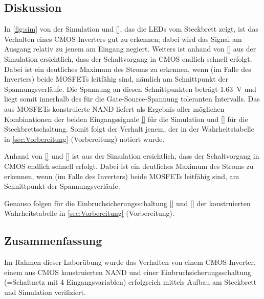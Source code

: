 \documentclass[12pt,english,ngerman]{scrartcl}
\begin{document}
\subsection{Diskussion}
In \autoref{fig:sim} von der Simulation und \autoref{}, das die LEDs vom Steckbrett zeigt,
ist das Verhalten eines CMOS-Inverters gut zu erkennen; dabei wird das Signal
am Ausgang relativ zu jenem am Eingang negiert.
Weiters ist anhand von \autoref{} aus der Simulation ersichtlich, dass
der Schaltvorgang in CMOS endlich schnell erfolgt. Dabei ist ein deutliches
Maximum des Stroms zu erkennen, wenn (im Falle des Inverters) beide MOSFETs
leitfähig sind, nämlich am Schnittpunkt der Spannungsverläufe.
Die Spannung an diesen Schnittpunkten beträgt \SI{1,63}{\volt} und liegt
somit innerhalb des für die Gate-Source-Spannung toleranten Intervalls.
\newline
Das aus MOSFETs konstruierte NAND liefert als Ergebnis aller möglichen
Kombinationen der beiden Eingangssignale \autoref{} für die Simulation
und \autoref{} für die Steckbrettschaltung.
Somit folgt der Verhalt jenem, der in der Wahrheitstabelle in \autoref{sec:Vorbereitung}
(Vorbereitung) notiert wurde.



Anhand von \autoref{} und \autoref{} ist aus der Simulation ersichtlich, dass
der Schaltvorgang in CMOS endlich schnell erfolgt. Dabei ist ein deutliches
Maximum des Stroms zu erkennen, wenn (im Falle des Inverters) beide MOSFETs
leitfähig sind, am Schnittpunkt der Spannungsverläufe. 

Genauso folgen für die Einbruchsicherungsschaltung \autoref{} und \autoref{}
der konstruierten Wahrheitstabelle in \autoref{sec:Vorbereitung} (Vorbereitung).


\subsection{Zusammenfassung}
Im Rahmen dieser Laborübung wurde das Verhalten von einem CMOS-Inverter, einem aus CMOS konstruierten NAND und einer Einbruchsicherungsschaltung (=Schaltnetz mit 4 Eingangsvariablen) erfolgreich mittels Aufbau am Steckbrett und Simulation verifiziert.
\newpage

\printbibliography

\listoffigures

\listoftables
\end{document}
